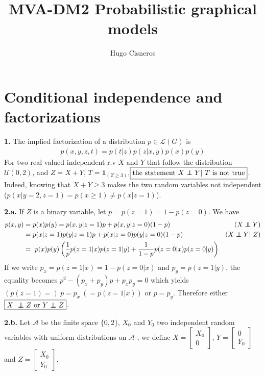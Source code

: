 \documentclass[11pt, oneside]{amsart}   	%
\title{MVA-DM2 Probabilistic graphical models}
\author{Hugo Cisneros}
\date{}							%
\newcommand\indep{\protect\mathpalette{\protect\indeP}{\perp}}
\def\indeP#1#2{\mathrel{\rlap{$#1#2$}\mkern2mu{#1#2}}}
\begin{document}
\maketitle
\section{Conditional independence and factorizations}
 \vfill
\textbf{1.}  The implied factorization of a distribution $p\in \mathcal{L}(G)$ is
\begin{align*} 
p(x, y, z, t) = p(t|z)p(z|x, y)p(x)p(y)
\end{align*}
For two real valued independent r.v $X$ and $Y$ that follow the distribution $\mathcal{U}(0, 2)$, and $Z = X+Y$, $T = \mathbf{1}_{(Z \geq 3)}$,$\boxed{\text{the statement } X\indep Y | T \text{ is not true}}$.
Indeed, knowing that $X+Y \geq 3$ makes the two random variables not independent ($p(x| y=2, z=1) = p(x \geq 1) \neq p(x|z=1)$).
\vfill
 
 \textbf{2.a.} If $Z$ is a binary variable, let $p = p(z=1) = 1 - p(z=0)$. We have 
 \begin{align*}
 	p(x, y) &= p(x)p(y) = p(x, y|z=1)p + p(x, y|z=0)(1-p) & (X\indep Y ) \\
	& = p(x|z=1)p(y|z=1)p + p(x|z=0)p(y|z=0)(1-p) & (X\indep Y | Z)\\
	&  = p(x)p(y)\left(\frac{1}{p} p(z=1|x)p(z=1|y) + \frac{1}{1-p}p(z=0|x)p(z=0|y)\right)
 \end{align*}
 If we write $p_x = p(z=1|x) = 1-p(z=0|x)$ and $p_y = p(z=1|y)$, the equality becomes $p^2 - (p_x + p_y)p + p_xp_y
 = 0$ which yields $ \left(p(z=1) = \right)\ p = p_x\ ( =  p(z=1|x) )$ or $p = p_y$. Therefore either $\boxed{X \indep Z \text{ or } Y \indep Z}$.
\vfill
 
 \textbf{2.b.} Let $\mathcal{A}$ be the finite space $\{0, 2\}$, $X_0$ and $Y_0$ two independent random variables with uniform distributions on $\mathcal{A}$ , 
 we define $X =\begin{bmatrix} X_0 \\ 0 \end{bmatrix}$, $Y = \begin{bmatrix} 0 \\ Y_0 \end{bmatrix}$ and $Z = \begin{bmatrix} X_0 \\ Y_0 \end{bmatrix}$. 
 \\
 
\end{document}

